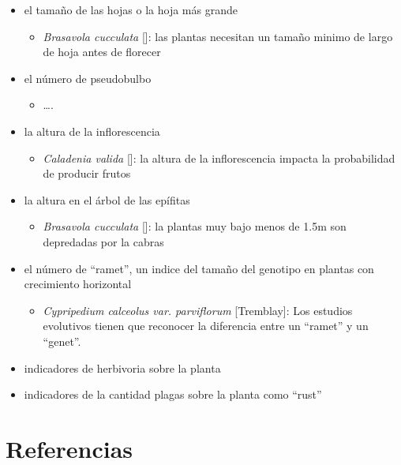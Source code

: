 \documentclass[
]{book}
\providecommand{\tightlist}{%
  \setlength{\itemsep}{0pt}\setlength{\parskip}{0pt}}
\theoremstyle{definition}
\theoremstyle{definition}
\theoremstyle{definition}
\theoremstyle{definition}
\theoremstyle{remark}
\begin{document}
\begin{itemize}
\item
  el tamaño de las hojas o la hoja más grande

  \begin{itemize}
  \tightlist
  \item
    \emph{Brasavola cucculata} {[}{]}: las plantas necesitan un tamaño minimo de largo de hoja antes de florecer
  \end{itemize}
\item
  el número de pseudobulbo

  \begin{itemize}
  \tightlist
  \item
    \ldots.
  \end{itemize}
\item
  la altura de la inflorescencia

  \begin{itemize}
  \tightlist
  \item
    \emph{Caladenia valida} {[}{]}: la altura de la inflorescencia impacta la probabilidad de producir frutos
  \end{itemize}
\item
  la altura en el árbol de las epífitas

  \begin{itemize}
  \tightlist
  \item
    \emph{Brasavola cucculata} {[}{]}: la plantas muy bajo menos de 1.5m son depredadas por la cabras
  \end{itemize}
\item
  el número de ``ramet'', un indice del tamaño del genotipo en plantas con crecimiento horizontal

  \begin{itemize}
  \tightlist
  \item
    \emph{Cypripedium calceolus var. parviflorum} {[}Tremblay{]}: Los estudios evolutivos tienen que reconocer la diferencia entre un ``ramet'' y un ``genet''.
  \end{itemize}
\item
  indicadores de herbivoria sobre la planta
\item
  indicadores de la cantidad plagas sobre la planta como ``rust''
\end{itemize}

\hypertarget{referencias-2}{%
\section{Referencias}\label{referencias-2}}
\end{document}
